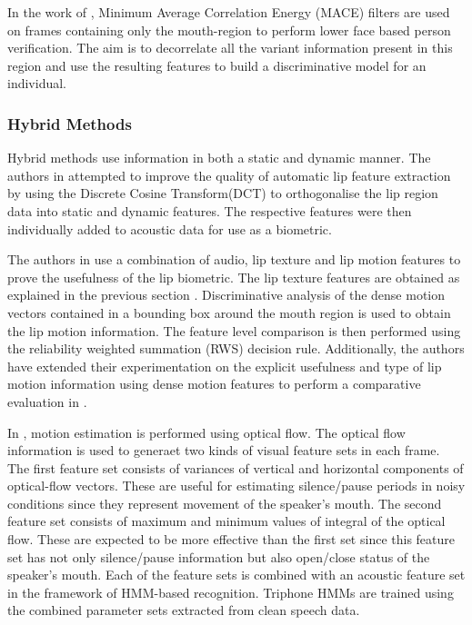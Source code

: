 \documentclass[a4paper, 10pt, conference]{ieeeconf}      %
\begin{document}
In the work of \cite{Samad07Lower}, Minimum Average Correlation Energy (MACE) filters are used on frames containing only the mouth-region to perform lower face based person verification. The aim is to decorrelate all the variant information present in this region and use the resulting features to build a discriminative model for an individual. 

\subsubsection{Hybrid Methods}
Hybrid methods use information in both a static and dynamic manner. The authors in \cite{Auckenthaler99lip} attempted to improve the quality of automatic lip feature extraction by using the Discrete Cosine Transform(DCT) to orthogonalise the lip region data into static and dynamic features. The respective features were then individually added to acoustic data for use as a biometric. 

The authors in \cite{Cetingul06Multi} use a combination of audio, lip texture and lip motion features to prove the usefulness of the lip biometric. The lip texture features are obtained as explained in the previous section \cite{Cetingul04Use}. Discriminative analysis of the dense motion vectors contained in a bounding box around the mouth region is used to obtain the lip motion information. The feature level comparison is then performed using the reliability weighted summation (RWS) decision rule. Additionally, the authors have extended their experimentation on the explicit usefulness and type of lip motion information using dense motion features to perform a comparative evaluation in \cite{Cetingul06Discriminative}.

In \cite{Tamura04Multi}, motion estimation is performed using optical flow. The optical flow information is used to generaet two kinds of visual feature sets in each frame. The first feature set consists of variances of vertical and horizontal components of optical-flow vectors. These are useful for estimating silence/pause periods in noisy conditions since they represent movement of the speaker’s mouth. The second feature set consists of maximum and minimum values of integral of the optical flow. These are expected to be more effective than the first set since this feature set has not only silence/pause information but also open/close status of the speaker’s mouth. Each of the feature sets is combined with an acoustic feature set in the framework of HMM-based recognition. Triphone HMMs are trained using the combined parameter sets extracted from clean speech data. 
\end{document}
